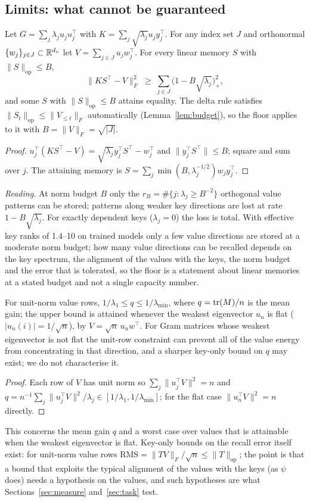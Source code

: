 \subsection{Limits: what cannot be guaranteed}
\begin{theorem}\label{thm:cap}
Let $G=\sum_j\lambda_ju_ju_j^\top$ with $K=\sum_j\sqrt{\lambda_j}u_jy_j^\top$. For any index set $J$ and orthonormal $\{w_j\}_{j\in J}\subset\mathbb{R}^{d_v}$ let $V=\sum_{j\in J}u_jw_j^\top$. For every linear memory $S$ with $\|S\|_{\mathrm{op}}\le B$,
\[
\|KS^\top-V\|_F^2\;\ge\;\sum_{j\in J}\big(1-B\sqrt{\lambda_j}\big)_+^2,
\]
and some $S$ with $\|S\|_{\mathrm{op}}\le B$ attains equality. The delta rule satisfies $\|S_t\|_{\mathrm{op}}\le\|V_{\le t}\|_F$ automatically (Lemma~\ref{lem:budget}), so the floor applies to it with $B=\|V\|_F=\sqrt{|J|}$.
\end{theorem}
\begin{proof}
$u_j^\top(KS^\top-V)=\sqrt{\lambda_j}y_j^\top S^\top-w_j^\top$ and $\|y_j^\top S^\top\|\le B$; square and sum over $j$. The attaining memory is $S=\sum_j\min(B,\lambda_j^{-1/2})w_jy_j^\top$.
\end{proof}
\emph{Reading.} At norm budget $B$ only the $r_B=\#\{j:\lambda_j\ge B^{-2}\}$ orthogonal value patterns can be stored; patterns along weaker key directions are lost at rate $1-B\sqrt{\lambda_j}$. For exactly dependent keys ($\lambda_j=0$) the loss is total. With effective key ranks of 1.4--10 on trained models only a few value directions are stored at a moderate norm budget; how many value directions can be recalled depends on the key spectrum, the alignment of the values with the keys, the norm budget and the error that is tolerated, so the floor is a statement about linear memories at a stated budget and not a single capacity number.

\begin{proposition}\label{prop:nokey}
For unit-norm value rows, $1/\lambda_1\le q\le1/\lambda_{\min}$, where $q=\operatorname{tr}(M)/n$ is the mean gain; the upper bound is attained whenever the weakest eigenvector $u_n$ is flat ($|u_n(i)|=1/\sqrt n$), by $V=\sqrt n\,u_nw^\top$. For Gram matrices whose weakest eigenvector is not flat the unit-row constraint can prevent all of the value energy from concentrating in that direction, and a sharper key-only bound on $q$ may exist; we do not characterise it.
\end{proposition}
\begin{proof}
Each row of $V$ has unit norm so $\sum_j\|u_j^\top V\|^2=n$ and $q=n^{-1}\sum_j\|u_j^\top V\|^2/\lambda_j\in[1/\lambda_1,1/\lambda_{\min}]$; for the flat case $\|u_n^\top V\|^2=n$ directly.
\end{proof}
This concerns the mean gain $q$ and a worst case over values that is attainable when the weakest eigenvector is flat. Key-only bounds on the recall error itself exist: for unit-norm value rows $\mathrm{RMS}=\|TV\|_F/\sqrt n\le\|T\|_{\mathrm{op}}$; the point is that a bound that exploits the typical alignment of the values with the keys (as $\psi$ does) needs a hypothesis on the values, and such hypotheses are what Sections~\ref{sec:measure} and~\ref{sec:task} test.

